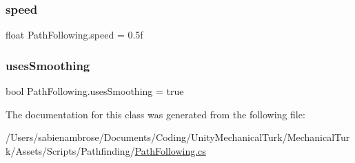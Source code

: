 \mbox{\label{class_path_following_a49b1482d4ff9c77a24e86d7cd05322c5}} 
\subsubsection{\texorpdfstring{speed}{speed}}
{\footnotesize\ttfamily float Path\+Following.\+speed = 0.\+5f}

\mbox{\label{class_path_following_ac9f0499d23632e1ebc46c69cea2c615b}} 
\subsubsection{\texorpdfstring{uses\+Smoothing}{usesSmoothing}}
{\footnotesize\ttfamily bool Path\+Following.\+uses\+Smoothing = true}



The documentation for this class was generated from the following file\+:\begin{DoxyCompactItemize}
\item 
/\+Users/sabienambrose/\+Documents/\+Coding/\+Unity\+Mechanical\+Turk/\+Mechanical\+Turk/\+Assets/\+Scripts/\+Pathfinding/\mbox{\hyperlink{_path_following_8cs}{Path\+Following.\+cs}}\end{DoxyCompactItemize}
